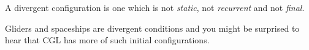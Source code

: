 \begin{proposition}
A divergent configuration is one which is not \textit{static}, not \textit{recurrent} and not
\textit{final}.
\end{proposition}

Gliders and spaceships are divergent conditions and you might be surprised to hear that
CGL has more of such initial configurations.


